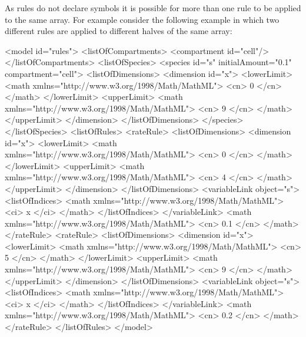 \documentclass{cekarticle}
\begin{document}
As rules do not declare symbols it is possible for more than one
rule to be applied to the same array. For example consider the
following example in which two different rules are applied to different halves of the
same array:

\begin{example}
<model id="rules">
    <listOfCompartments>
        <compartment id="cell"/>
    </listOfCompartments>
    <listOfSpecies>
        <species id="s" initialAmount="0.1" compartment="cell">
            <listOfDimensions>
                <dimension id="x">
                    <lowerLimit>
                        <math xmlns="http://www.w3.org/1998/Math/MathML">
                            <cn> 0 </cn>
                        </math>
                    </lowerLimit>
                    <upperLimit>
                        <math xmlns="http://www.w3.org/1998/Math/MathML">
                            <cn> 9 </cn>
                        </math>
                    </upperLimit>
                </dimension>
            </listOfDimensions>
        </species>
    </listOfSpecies>
    <listOfRules>
        <rateRule>
            <listOfDimensions>
                <dimension id="x">
                    <lowerLimit>
                        <math xmlns="http://www.w3.org/1998/Math/MathML">
                            <cn> 0 </cn>
                        </math>
                    </lowerLimit>
                    <upperLimit>
                        <math xmlns="http://www.w3.org/1998/Math/MathML">
                            <cn> 4 </cn>
                        </math>
                    </upperLimit>
                </dimension>
            </listOfDimensions>
            <variableLink object="s">
                <listOfIndices>
                    <math xmlns="http://www.w3.org/1998/Math/MathML">
                        <ci> x </ci>
                    </math>          
                </listOfIndices>
            </variableLink>
            <math xmlns="http://www.w3.org/1998/Math/MathML">
                <cn> 0.1 </cn>
            </math>
        </rateRule>
        <rateRule>
            <listOfDimensions>
                <dimension id="x">
                    <lowerLimit>
                        <math xmlns="http://www.w3.org/1998/Math/MathML">
                            <cn> 5 </cn>
                        </math>
                    </lowerLimit>
                    <upperLimit>
                        <math xmlns="http://www.w3.org/1998/Math/MathML">
                            <cn> 9 </cn>
                        </math>
                    </upperLimit>
                </dimension>
            </listOfDimensions>
            <variableLink object="s">
                <listOfIndices>
                    <math xmlns="http://www.w3.org/1998/Math/MathML">
                        <ci> x </ci>
                    </math>          
                </listOfIndices>
            </variableLink>
            <math xmlns="http://www.w3.org/1998/Math/MathML">
                <cn> 0.2 </cn>
            </math>
        </rateRule>
    </listOfRules>
</model>
\end{example}
\end{document}
